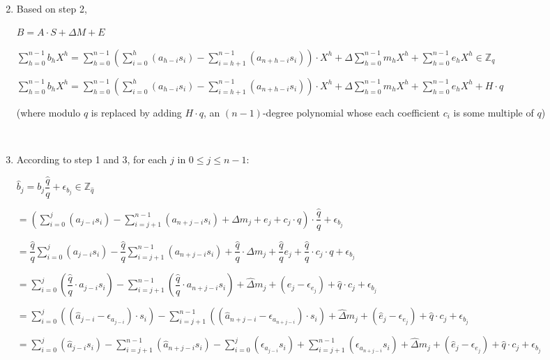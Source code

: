 \begin{enumerate}
$ $




\item Based on step 2,

$B = A \cdot S + \Delta  M + E$ 


$\sum\limits_{h=0}^{n-1}  b_h  X^{h}  = \sum\limits_{h=0}^{n-1}  \left(\sum\limits_{i=0}^{h}(a_{h-i}s_{i}) - \sum\limits_{i=h+1}^{n-1}(a_{n+h-i}s_{i}) \right)\cdot X^{h}  + \Delta \sum\limits_{h=0}^{n-1}  m_h  X^{h} + \sum\limits_{h=0}^{n-1}  e_h  X^{h}  \in \mathbb{Z}_q$

$\sum\limits_{h=0}^{n-1}  b_h  X^{h}  = \sum\limits_{h=0}^{n-1}  \left(\sum\limits_{i=0}^{h}(a_{h-i}s_{i}) - \sum\limits_{i=h+1}^{n-1}(a_{n+h-i}s_{i}) \right)\cdot X^{h}  + \Delta \sum\limits_{h=0}^{n-1}  m_h  X^{h} + \sum\limits_{h=0}^{n-1}  e_h  X^{h} + H \cdot q$

(where modulo $q$ is replaced by adding $H \cdot q$, an $(n-1)$-degree polynomial whose each coefficient $c_i$ is some multiple of $q$)

$ $

\item According to step 1 and 3, for each $j$ in $0 \leq j \leq n-1$:

$\hat{b}_j = b_j\dfrac{\hat{q}}{q} + \epsilon_{b_j} \in \mathbb{Z}_{\hat{q}}$

$= \left(\sum\limits_{i=0}^{j}(a_{j-i}s_{i}) - \sum\limits_{i=j+1}^{n-1}(a_{n+j-i}s_{i}) + \Delta m_j + e_j + c_j \cdot q\right) \cdot \dfrac{\hat{q}}{q} + \epsilon_{b_j}$

$= \dfrac{\hat{q}}{q} \sum\limits_{i=0}^{j}(a_{j-i}s_{i}) - \dfrac{\hat{q}}{q} \sum\limits_{i=j+1}^{n-1}(a_{n+j-i}s_{i}) + \dfrac{\hat{q}}{q} \cdot \Delta m_j + \dfrac{\hat{q}}{q} e_j + \dfrac{\hat{q}}{q} \cdot c_j \cdot q + \epsilon_{b_j}$

$=  \sum\limits_{i=0}^{j}\left(\dfrac{\hat{q}}{q}\cdot a_{j-i}s_{i}\right) - \sum\limits_{i=j+1}^{n-1}\left(\dfrac{\hat{q}}{q} \cdot a_{n+j-i}s_{i}\right) + \hat{\Delta} m_j + (\hat{e}_j - \epsilon_{e_j}) + \hat{q} \cdot c_j + \epsilon_{b_j}$

$=  \sum\limits_{i=0}^{j}((\hat{a}_{j-i}-\epsilon_{a_{j-i}})\cdot s_{i}) - \sum\limits_{i=j+1}^{n-1}((\hat{a}_{n+j-i}-\epsilon_{a_{n+j-i}})\cdot s_{i}) + \hat{\Delta} m_j + (\hat{e}_j - \epsilon_{e_j}) + \hat{q} \cdot c_j + \epsilon_{b_j}$

$=  \sum\limits_{i=0}^{j}(\hat{a}_{j-i}s_i) 
- \sum\limits_{i=j+1}^{n-1}(\hat{a}_{n+j-i}s_i)
- \sum\limits_{i=0}^{j}(\epsilon_{a_{j-i}} s_i)
+ \sum\limits_{i=j+1}^{n-1}(\epsilon_{a_{n+j-i}} s_i)
+ \hat{\Delta} m_j + (\hat{e}_j - \epsilon_{e_j}) + \hat{q} \cdot c_j + \epsilon_{b_j}$



\end{enumerate}

